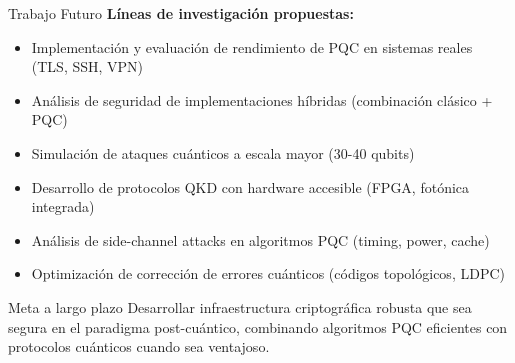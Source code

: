 \documentclass[aspectratio=169]{beamer}
\begin{document}
\begin{frame}{Trabajo Futuro}
\textbf{Líneas de investigación propuestas:}
\begin{itemize}
\item Implementación y evaluación de rendimiento de PQC en sistemas reales (TLS, SSH, VPN)
\item Análisis de seguridad de implementaciones híbridas (combinación clásico + PQC)
\item Simulación de ataques cuánticos a escala mayor (30-40 qubits)
\item Desarrollo de protocolos QKD con hardware accesible (FPGA, fotónica integrada)
\item Análisis de side-channel attacks en algoritmos PQC (timing, power, cache)
\item Optimización de corrección de errores cuánticos (códigos topológicos, LDPC)
\end{itemize}

\vspace{0.3cm}
\begin{block}{Meta a largo plazo}
Desarrollar infraestructura criptográfica robusta que sea segura en el paradigma post-cuántico, combinando algoritmos PQC eficientes con protocolos cuánticos cuando sea ventajoso.
\end{block}
\end{frame}
\end{document}
